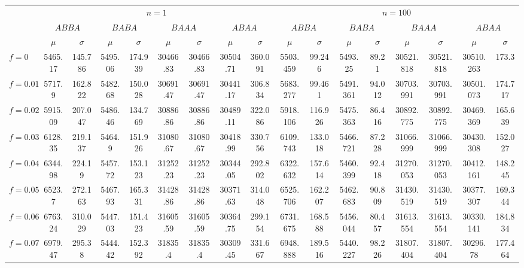 \begin{tabular}{@{}lcccccccccccccccc@{}}
\toprule
 & \multicolumn{8}{c}{$n=1$} & \multicolumn{8}{c}{$n=100$} \\
\cmidrule(lr){2-9} \cmidrule(lr){10-17}
 & \multicolumn{2}{c}{$ABBA$} & \multicolumn{2}{c}{$BABA$} & \multicolumn{2}{c}{$BAAA$} & \multicolumn{2}{c}{$ABAA$} & \multicolumn{2}{c}{$ABBA$} & \multicolumn{2}{c}{$BABA$} & \multicolumn{2}{c}{$BAAA$} & \multicolumn{2}{c}{$ABAA$} \\
\cmidrule(lr){2-3} \cmidrule(lr){4-5} \cmidrule(lr){6-7} \cmidrule(lr){8-9} \cmidrule(lr){10-11} \cmidrule(lr){12-13} \cmidrule(lr){14-15} \cmidrule(lr){16-17}
 & $\mu$ & $\sigma$ & $\mu$ & $\sigma$ & $\mu$ & $\sigma$ & $\mu$ & $\sigma$ & $\mu$ & $\sigma$ & $\mu$ & $\sigma$ & $\mu$ & $\sigma$ & $\mu$ & $\sigma$ \\
\midrule
$f = 0$ & 5465.17 & 145.786 & 5495.06 & 174.939 & 30466.83 & 30466.83 & 30504.71 & 360.091 & 5503.459 & 99.246 & 5493.25 & 89.21 & 30521.818 & 30521.818 & 30510.263 & 173.3 \\
$f = 0.01$ & 5717.9 & 162.822 & 5482.68 & 150.028 & 30691.47 & 30691.47 & 30441.17 & 306.834 & 5683.277 & 99.461 & 5491.361 & 94.012 & 30703.991 & 30703.991 & 30501.073 & 174.717 \\
$f = 0.02$ & 5915.09 & 207.047 & 5486.46 & 134.769 & 30886.86 & 30886.86 & 30489.11 & 322.086 & 5918.106 & 116.926 & 5475.363 & 86.416 & 30892.775 & 30892.775 & 30469.369 & 165.639 \\
$f = 0.03$ & 6128.35 & 219.137 & 5464.9 & 151.926 & 31080.67 & 31080.67 & 30418.99 & 330.756 & 6109.743 & 133.018 & 5466.721 & 87.228 & 31066.999 & 31066.999 & 30430.308 & 152.027 \\
$f = 0.04$ & 6344.98 & 224.19 & 5457.72 & 153.123 & 31252.23 & 31252.23 & 30344.05 & 292.802 & 6322.632 & 157.614 & 5460.399 & 92.418 & 31270.053 & 31270.053 & 30412.161 & 148.245 \\
$f = 0.05$ & 6523.7 & 272.163 & 5467.93 & 165.331 & 31428.86 & 31428.86 & 30371.63 & 314.048 & 6525.706 & 162.207 & 5462.683 & 90.809 & 31430.519 & 31430.519 & 30377.307 & 169.344 \\
$f = 0.06$ & 6763.24 & 310.029 & 5447.03 & 151.423 & 31605.59 & 31605.59 & 30364.75 & 299.154 & 6731.675 & 168.588 & 5456.044 & 80.457 & 31613.554 & 31613.554 & 30330.141 & 184.834 \\
$f = 0.07$ & 6979.47 & 295.38 & 5444.42 & 152.392 & 31835.4 & 31835.4 & 30309.45 & 331.667 & 6948.888 & 189.516 & 5440.227 & 98.226 & 31807.404 & 31807.404 & 30296.78 & 177.464 \\

\end{tabular}
